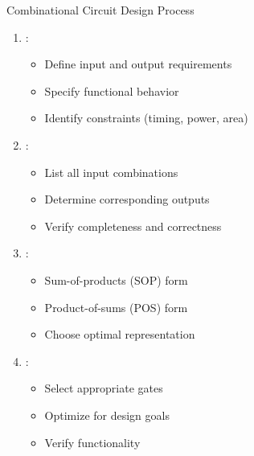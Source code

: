 \begin{frame}{Combinational Circuit Design Process}
\begin{enumerate}
\item {}:
\begin{itemize}
\item Define input and output requirements
\item Specify functional behavior
\item Identify constraints (timing, power, area)
\end{itemize}
\vspace{0.3cm}
\item {}:
\begin{itemize}
\item List all input combinations
\item Determine corresponding outputs
\item Verify completeness and correctness
\end{itemize}
\vspace{0.3cm}
\item {}:
\begin{itemize}
\item Sum-of-products (SOP) form
\item Product-of-sums (POS) form
\item Choose optimal representation
\end{itemize}
\vspace{0.3cm}
\item {}:
\begin{itemize}
\item Select appropriate gates
\item Optimize for design goals
\item Verify functionality
\end{itemize}
\end{enumerate}
\end{frame}

